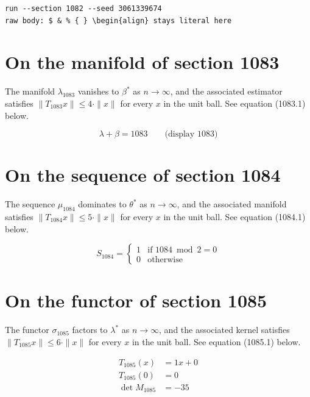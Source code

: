 \documentclass{article}
\begin{document}
\begin{verbatim}
run --section 1082 --seed 3061339674
raw body: $ & % { } \begin{align} stays literal here
\end{verbatim}

\section{On the manifold of section 1083}
The manifold $\lambda_{1083}$ vanishes to $\beta^{*}$ as $n \to \infty$,
and the associated estimator satisfies $\|T_{1083} x\| \leq 4 \cdot \|x\|$
for every $x$ in the unit ball. See equation (1083.1) below.

$$
\lambda + \beta = 1083 \qquad \text{(display 1083)}
$$

\section{On the sequence of section 1084}
The sequence $\mu_{1084}$ dominates to $\theta^{*}$ as $n \to \infty$,
and the associated manifold satisfies $\|T_{1084} x\| \leq 5 \cdot \|x\|$
for every $x$ in the unit ball. See equation (1084.1) below.

\begin{equation}
S_{1084} = \begin{cases} 1 & \text{if } 1084 \bmod 2 = 0 \\ 0 & \text{otherwise} \end{cases}
\end{equation}

\section{On the functor of section 1085}
The functor $\sigma_{1085}$ factors to $\lambda^{*}$ as $n \to \infty$,
and the associated kernel satisfies $\|T_{1085} x\| \leq 6 \cdot \|x\|$
for every $x$ in the unit ball. See equation (1085.1) below.

\begin{align}
T_{1085}(x) &= 1 x + 0 \\
T_{1085}(0) &= 0 \\
\det M_{1085} &= -35
\end{align}
\end{document}
